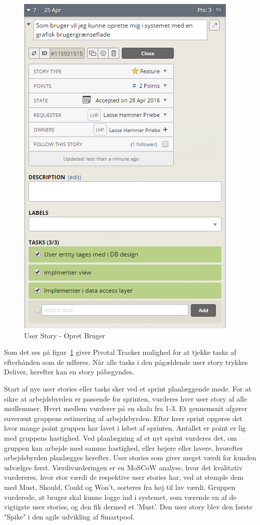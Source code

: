 \begin{figure}
	\centering
	\includegraphics[width=0.6\linewidth]{figs/processProjektGennemforsel/userstory_with_tasks.PNG}
	\caption{User Story - Opret Bruger}
	\label{fig:userstory_with_tasks}
\end{figure}

Som det ses på figur~\ref{fig:userstory_with_tasks} giver Pivotal Tracker mulighed for at tjekke tasks af efterhånden som de udføres. Når alle tasks i den pågældende user story trykkes Deliver, herefter kan en story påbegyndes. 

Start af nye user stories eller tasks sker ved et sprint planlæggende møde. For at sikre at arbejdsbyrden er passende for sprinten, vurderes hver user story af alle medlemmer. Hvert medlem vurderer på en skala fra 1-3. Et gennemsnit afgører suverænt gruppens estimering af arbejdsbyrden. Efter hver sprint opgøres det hvor mange point gruppen har lavet i løbet af sprinten. Antallet er point er lig med gruppens hastighed. Ved planlægning af et nyt sprint vurderes det, om gruppen kan arbejde med samme hastighed, eller højere eller lavere, hvorefter arbejdsbyrden planlægges herefter. User stories som giver meget værdi for kunden udvælges først. Værdivurderingen er en MoSCoW analyse, hvor det kvalitativ vurdereres, hvor stor værdi de respektive user stories har, ved at stemple dem med Must, Should, Could og Won't, sorteres fra høj til lav værdi. Gruppen vurderede, at bruger skal kunne logge ind i systemet, som værende en af de vigtigste user stories, og den fik dermed et 'Must'. Den user story blev den første "Spike" i den agile udvikling af Smartpool.  

